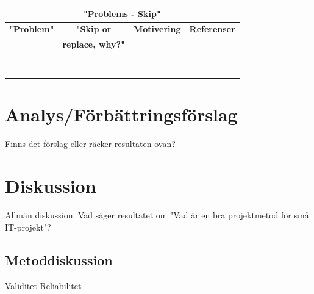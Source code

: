 \documentclass[conference]{IEEEtran}
\begin{document}
\begin{table}[htbp]
\begin{center}
\begin{tabular}{|c|c|c|c|}
\hline
\multicolumn{4}{|c|}{\cellcolor{grey}\textbf{"Problems - Skip"}}\\
\hline \rowcolor{grey}
\textbf{"Problem"}                      & \textbf{"Skip or}        & \textbf{Motivering} & \textbf{Referenser} \\
\rowcolor{grey}                         & \textbf{replace, why?"}  &                     &  \\
\hline
                                        &                          &                     & \\
                                        &                          &                     & \\
\hline
                                        &                          &                     & \\
                                        &                          &                     & \\
\hline
                                        &                          &                     & \\
\hline
                                        &                          &                     & \\
\hline
                                        &                          &                     & \\
\hline
                                        &                          &                     & \\
\hline
\end{tabular}
\label{tab1}
\end{center}
\end{table}

\section{Analys/Förbättringsförslag}
Finns det förslag eller räcker resultaten ovan?

\section{Diskussion}
Allmän diskussion. Vad säger resultatet om "Vad är en bra projektmetod för små IT-projekt"?

\subsection{Metoddiskussion}
Validitet
Reliabilitet
\end{document}
